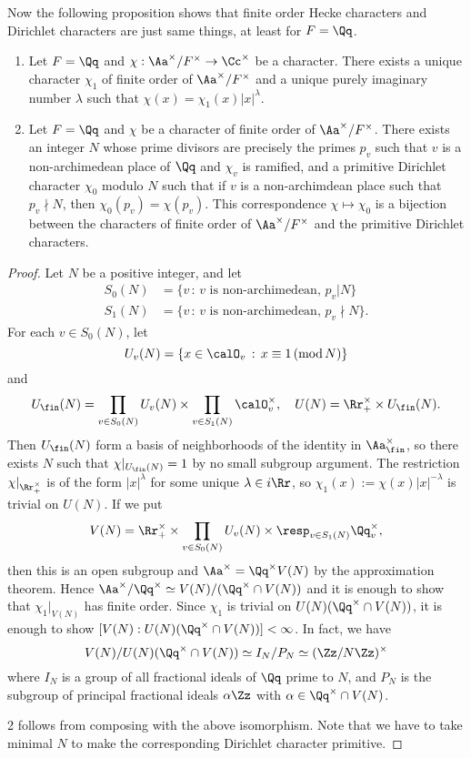 Now the following proposition shows that finite order Hecke characters and Dirichlet characters are just same things, at least for $F = \Qq$. 
\begin{proposition}
\label{dirad}
\begin{enumerate}
\item Let $F = \Qq$ and $\chi:\Aa^{\times}/F^{\times} \to \Cc^{\times}$ be a character. There exists a unique character $\chi_{1}$ of finite order of $\Aa^{\times}/F^{\times}$ and a unique purely imaginary number $\lambda$ such that $\chi(x) = \chi_{1}(x) |x|^{\lambda}$. 
\item Let $F = \Qq$ and $\chi$ be a character of finite order of $\Aa^{\times}/F^{\times}$. 
There exists an integer $N$ whose prime divisors are precisely the primes $p_{v}$ such that $v$ is a non-archimedean place of $\Qq$ and $\chi_{v}$ is ramified, and a primitive Dirichlet character $\chi_{0}$ modulo $N$ such that if $v$ is a non-archimdean place such that $p_{v}\nmid N$, then $\chi_{0}(p_{v}) = \chi(p_{v})$. 
This correspondence $\chi\mapsto \chi_{0}$ is a bijection between the characters of finite order of $\Aa^{\times}/F^{\times}$ and the primitive Dirichlet characters. 
\end{enumerate}
\end{proposition}
\begin{proof}
Let $N$ be a positive integer, and let 
\begin{align*}
S_{0}(N) &= \{v\,:\, v\text{ is non-archimedean},\, p_{v}|N\} \\
S_{1}(N) &= \{v\,:\, v\text{ is non-archimedean},\, p_{v}\nmid N\}.
\end{align*}
For each $v\in S_{0}(N)$, let 
$$
U_{v}(N) = \{x\in\calO_{v}\,:\, x\equiv 1\Mod{N}\}
$$
and
$$
U_{\fin}(N) = \prod_{v\in S_{0}(N)} U_{v}(N) \times \prod_{v\in S_{1}(N)} \calO_{v}^{\times}, \quad U(N) = \Rr_{+}^{\times} \times U_{\fin}(N).
$$
Then $U_{\fin}(N)$ form a basis of neighborhoods of the identity in $\Aa_{\fin}^{\times}$, so there exists $N$ such that $\chi|_{U_{\fin}(N)}=1$ by no small subgroup argument. 
The restriction $\chi|_{\Rr_{+}^{\times}}$ is of the form $|x|^{\lambda}$ for some unique $\lambda\in i\Rr$, so $\chi_{1}(x):= \chi(x)|x|^{-\lambda}$ is trivial on $U(N)$. 
If we put 
$$
V(N) = \Rr_{+}^{\times} \times \prod_{v\in S_{0}(N)} U_{v}(N) \times\resp_{v\in S_{1}(N)} \Qq_{v}^{\times},
$$
then this is an open subgroup and $\Aa^{\times} = \Qq^{\times}V(N)$ by the approximation theorem. 
Hence $\Aa^{\times}/\Qq^{\times} \simeq V(N) /(\Qq^{\times}\cap V(N))$ and it is enough to show that $\chi_{1}|_{V(N)}$ has finite order. Since $\chi_{1}$ is trivial on $U(N)(\Qq^{\times}\cap V(N))$, it is enough to show $[V(N):U(N)(\Qq^{\times} \cap V(N))] <\infty$. 
In fact, we have
$$
V(N)/U(N)(\Qq^{\times}\cap V(N)) \simeq I_{N}/P_{N} \simeq (\Zz/N\Zz)^{\times}
$$
where $I_{N}$ is a group of all fractional ideals of $\Qq$ prime to $N$, and $P_{N}$ is the subgroup of principal fractional ideals $\alpha\Zz$ with $\alpha\in \Qq^{\times} \cap V(N)$. 

2  follows from composing with the above isomorphism. Note that we have to take minimal $N$ to make the corresponding Dirichlet character primitive. 
\end{proof}
